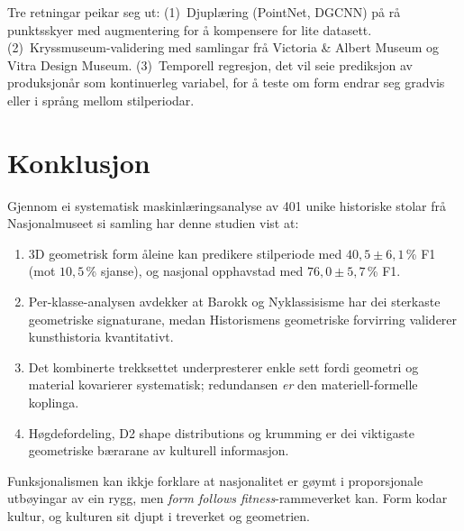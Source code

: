 \documentclass[12pt,a4paper]{article}
\begin{document}
Tre retningar peikar seg ut: (1)~Djupl\ae{}ring (PointNet, DGCNN) p\aa{} r\aa{} punktsskyer med augmentering for \aa{} kompensere for lite datasett. (2)~Kryssmuseum-validering med samlingar fr\aa{} Victoria \& Albert Museum og Vitra Design Museum. (3)~Temporell regresjon, det vil seie prediksjon av produksjon\aa{}r som kontinuerleg variabel, for \aa{} teste om form endrar seg gradvis eller i spr\aa{}ng mellom stilperiodar.

\section{Konklusjon}

Gjennom ei systematisk maskinl\ae{}ringsanalyse av 401 unike historiske stolar fr\aa{} Nasjonalmuseet si samling har denne studien vist at:

\begin{enumerate}
    \item 3D geometrisk form \aa{}leine kan predikere stilperiode med $40{,}5 \pm 6{,}1$\,\% F1 (mot $10{,}5$\,\% sjanse), og nasjonal opphavstad med $76{,}0 \pm 5{,}7$\,\% F1.
    \item Per-klasse-analysen avdekker at Barokk og Nyklassisisme har dei sterkaste geometriske signaturane, medan Historismens geometriske forvirring validerer kunsthistoria kvantitativt.
    \item Det kombinerte trekksettet underpresterer enkle sett fordi geometri og material kovarierer systematisk; redundansen \emph{er} den materiell-formelle koplinga.
    \item H\o{}gdefordeling, D2 shape distributions og krumming er dei viktigaste geometriske b\ae{}rarane av kulturell informasjon.
\end{enumerate}

Funksjonalismen kan ikkje forklare at nasjonalitet er g\o{}ymt i proporsjonale utb\o{}yingar av ein rygg, men \emph{form follows fitness}-rammeverket \citep{finne2026b} kan. Form kodar kultur, og kulturen sit djupt i treverket og geometrien.



\end{document}

